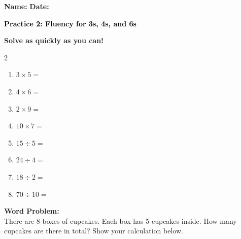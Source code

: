 \documentclass[12pt, letterpaper, fleqn]{article}
\newcommand{\blank}{\underline{\hspace{2.2cm}}}
\begin{document}
\textbf{Name:} \underline{\hspace{5cm}}
\hfill
\textbf{Date:} \underline{\hspace{3cm}}\\

\begin{tcolorbox}[colback=customteal!20]
    \large\textcolor{black}{\textbf{Practice 2: Fluency for 3s, 4s, and 6s}}
\end{tcolorbox}

\vspace{5mm}
\noindent
\textbf{Solve as quickly as you can!}

\vspace{5mm}
\begin{multicols}{2}
\begin{enumerate}[itemsep=1.2cm]
\item $3 \times 5 =$ \blank
\item $4 \times 6 =$ \blank
\item $2 \times 9 =$ \blank
\item $10 \times 7 =$ \blank
\item $15 \div 5 =$ \blank
\item $24 \div 4 =$ \blank
\item $18 \div 2 =$ \blank
\item $70 \div 10 =$ \blank
\end{enumerate}
\end{multicols}

\vspace{1.5cm}
\noindent
\textbf{Word Problem:}
\\
\noindent
There are 8 boxes of cupcakes. Each box has 5 cupcakes inside. How many cupcakes are there in total? Show your calculation below.
\vspace{3cm}
\end{document}
